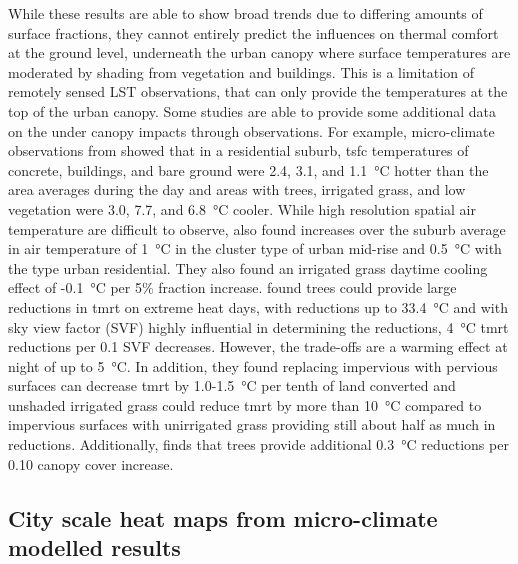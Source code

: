 \documentclass[final,3p,times,authoryear]{elsarticle}
\begin{document}
While these results are able to show broad trends due to differing amounts of surface fractions, they cannot entirely predict the influences on thermal comfort at the ground level, underneath the urban canopy where surface temperatures are moderated by shading from vegetation and buildings. This is a limitation of remotely sensed LST observations, that can only provide the temperatures at the top of the urban canopy. Some studies are able to provide some additional data on the under canopy impacts through observations. For example, micro-climate observations from \cite{Broadbent2017a} showed that in a residential suburb, \gls{tsfc} temperatures of concrete, buildings, and bare ground were 2.4, 3.1, and 1.1\SI{}{\degreeCelsius} hotter than the area averages during the day and areas with trees, irrigated grass, and low vegetation were 3.0, 7.7, and 6.8\SI{}{\degreeCelsius} cooler. While high resolution spatial air temperature are difficult to observe, \cite{Broadbent2017a} also found increases over the suburb average in air temperature of 1\SI{}{\degreeCelsius} in the cluster type of urban mid-rise and 0.5\SI{}{\degreeCelsius} with the type urban residential. They also found an irrigated grass daytime cooling effect of -0.1\SI{}{\degreeCelsius} per 5\% fraction increase. \cite{Middel2019a} found trees could provide large reductions in \gls{tmrt} on extreme heat days, with reductions up to 33.4\SI{}{\degreeCelsius} and with sky view factor (SVF) highly influential in determining the reductions, 4\SI{}{\degreeCelsius} \gls{tmrt} reductions per 0.1 SVF decreases. However, the trade-offs are a warming effect at night of up to 5\SI{}{\degreeCelsius}. In addition, they found replacing impervious with pervious surfaces can decrease \gls{tmrt} by 1.0-1.5\SI{}{\degreeCelsius} per tenth of land converted and unshaded irrigated grass could reduce \gls{tmrt} by more than 10\SI{}{\degreeCelsius} compared to impervious surfaces with unirrigated grass providing still about half as much in reductions. Additionally, \cite{Krayenhoff2021} finds that trees provide additional 0.3\SI{}{\degreeCelsius} reductions per 0.10 canopy cover increase.

\subsection{City scale heat maps from micro-climate modelled results}\label{sec:resultsheatmaps}
\end{document}
